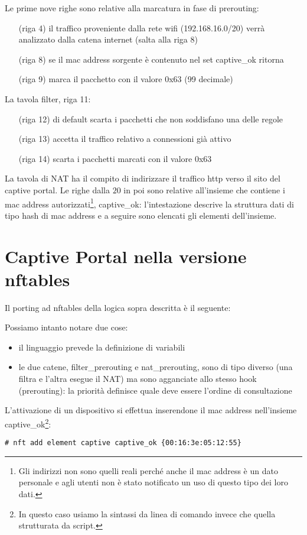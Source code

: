 Le prime nove righe sono relative alla marcatura in fase di prerouting:
\begin{itemize}[itemindent=2em]
    \item[(riga 4)] il traffico proveniente dalla rete wifi (192.168.16.0/20)
    verrà analizzato dalla catena internet (salta alla riga 8)
    \item[(riga 8)] se il mac address sorgente è contenuto nel set captive\_ok
    ritorna
    \item[(riga 9)] marca il pacchetto con il valore 0x63 (99 decimale)
  \end{itemize}
  La tavola filter, riga 11:
  \begin{itemize}[itemindent=2em]
    \item[(riga 12)] di default scarta i pacchetti che non soddisfano una delle regole
    \item[(riga 13)] accetta il traffico relativo a connessioni già attivo
    \item[(riga 14)] scarta i pacchetti marcati con il valore 0x63
\end{itemize}
La tavola di NAT ha il compito di indirizzare il traffico http verso il sito
del captive portal.
Le righe dalla $20$ in poi sono relative all'insieme che contiene i mac
address autorizzati\footnote{Gli indirizzi non sono quelli reali perché anche
il mac address è un dato personale e agli utenti non è stato notificato un uso
di questo tipo dei loro dati.}, captive\_ok:
l'intestazione descrive la struttura dati di tipo hash di mac address e a
seguire sono elencati gli elementi dell'insieme.

\section{Captive Portal nella versione nftables}
Il porting ad nftables della logica sopra descritta è il seguente:

Possiamo intanto notare due cose:
\begin{itemize}
	\item il linguaggio prevede la definizione di variabili
	
	\item le due catene, filter\_prerouting e nat\_prerouting, sono di tipo diverso
	(una filtra e l'altra esegue il NAT) ma sono agganciate allo stesso hook
    (prerouting): la priorità definisce quale deve essere l'ordine di consultazione
\end{itemize}
L'attivazione di un dispositivo si effettua inserendone il mac address nell'insieme
captive\_ok\footnote{In questo caso usiamo la sintassi da linea di comando invece che quella strutturata da script.}:
\begin{lstlisting}
# nft add element captive captive_ok {00:16:3e:05:12:55}
\end{lstlisting}

